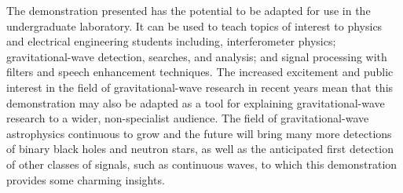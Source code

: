 \documentclass[paper-main.tex]{subfiles}
\begin{document}
The demonstration presented has the potential to be adapted for use in the undergraduate laboratory.
It can be used to teach topics of interest to physics and electrical engineering students including, interferometer physics; gravitational-wave detection, searches, and analysis; and signal processing with filters and speech enhancement techniques. 
The increased excitement and public interest in the field of gravitational-wave research in recent years mean that this demonstration may also be adapted as a tool for explaining gravitational-wave research to a wider, non-specialist audience. 
The field of gravitational-wave astrophysics continuous to grow and the future will bring many more detections of binary black holes and neutron stars, as well as the anticipated first detection of other classes of signals, such as continuous waves, to which this demonstration provides some charming insights. 




\end{document}
